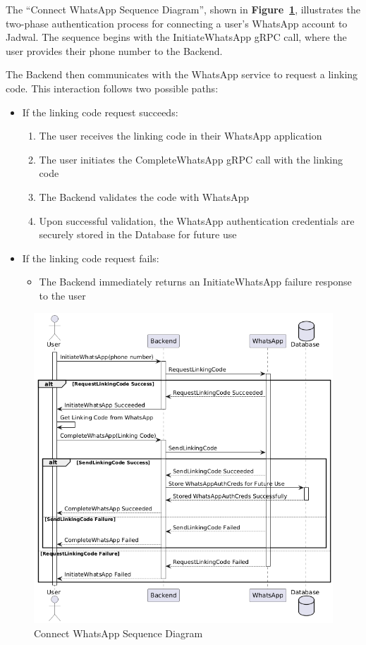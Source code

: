 The ``Connect WhatsApp Sequence Diagram'', shown in \textbf{Figure~\ref{fig:seq/connect-whatsapp}}, illustrates the two-phase authentication process for connecting a user's WhatsApp account to Jadwal. The sequence begins with the InitiateWhatsApp gRPC call, where the user provides their phone number to the Backend.

The Backend then communicates with the WhatsApp service to request a linking code. This interaction follows two possible paths:

\begin{itemize}
  \item If the linking code request succeeds:
        \begin{enumerate}
          \item The user receives the linking code in their WhatsApp application
          \item The user initiates the CompleteWhatsApp gRPC call with the linking code
          \item The Backend validates the code with WhatsApp
          \item Upon successful validation, the WhatsApp authentication credentials are securely stored in the Database for future use
        \end{enumerate}
  \item If the linking code request fails:
        \begin{itemize}
          \item The Backend immediately returns an InitiateWhatsApp failure response to the user
        \end{itemize}
\end{itemize}

\begin{figure}[!h]
  \centering
  \includegraphics[width=\textwidth]{images/docs/diagrams/sequence-diagrams/all-sequence-diagrams/Connect WhatsApp.png}
  \caption{Connect WhatsApp Sequence Diagram}
  \label{fig:seq/connect-whatsapp}
\end{figure}

